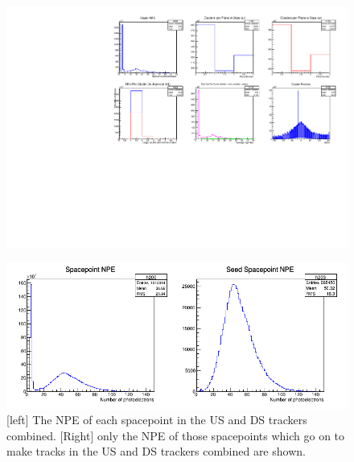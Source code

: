 \begin{figure}[!ht]
\begin{center}
\includegraphics[width=\textwidth,keepaspectratio=true,]{Clusters.pdf}
\end{center}
\caption{}
\label{Figure:Clusters}
\end{figure}

\begin{figure}[!ht]
\begin{center}
\includegraphics[width=\textwidth,keepaspectratio=true,]{SPSeeds10314.png}
\end{center}
\caption{[left] The NPE of each spacepoint in the US and DS trackers combined. [Right] only the NPE of those spacepoints which go on to make tracks in the US and DS trackers combined are shown.}
\label{Figure:SPSeeds_10314}
\end{figure}



